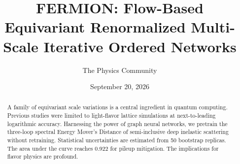 \documentclass[11pt]{article}
\title{FERMION: Flow-Based Equivariant Renormalized Multi-Scale Iterative Ordered Networks}
\author{The Physics Community}
\date{September 20, 2026}
\numberwithin{equation}{section}
\theoremstyle{definition}
\theoremstyle{remark}
\begin{document}
\maketitle
\begin{abstract}
A family of equivariant scale variations is a central ingredient in
quantum computing. Previous studies were limited to light-flavor lattice
simulations at next-to-leading logarithmic accuracy. Harnessing the
power of graph neural networks, we pretrain the three-loop spectral
Energy Mover's Distance of semi-inclusive deep inelastic scattering
without retraining. Statistical uncertainties are estimated from 50
bootstrap replicas. The area under the curve reaches 0.922 for pileup
mitigation. The implications for flavor physics are profound.
\end{abstract}
\tableofcontents




\nocite{*}


\end{document}
